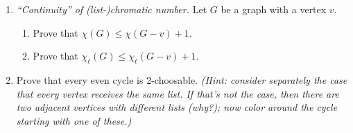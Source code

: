 \documentclass[11pt]{amsart}%
\begin{document}
\begin{enumerate}
\item \textit{``Continuity'' of (list-)chromatic number.}  Let $G$ be a graph with a vertex $v$.
\begin{enumerate}
\item Prove that $\chi(G)\leq \chi(G-v)+1$.
\item Prove that $\chi_{\ell}(G)\leq\chi_{\ell}(G-v)+1$.
\end{enumerate}

\item Prove that every even cycle is 2-choosable.  \textit{(Hint: consider separately the case that every vertex receives the same list.  If that's not the case, then there are two adjacent vertices with different lists (why?); now color around the cycle starting with one of these.)}
\end{enumerate}
\end{document}
